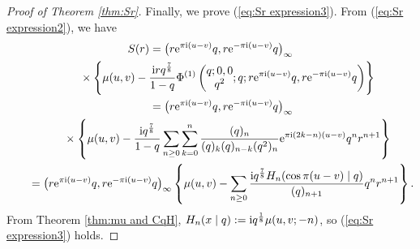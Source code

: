 \documentclass[pdftex]{sigma}
\numberwithin{equation}{section}
\theoremstyle{definition}
\begin{document}
\begin{proof}[Proof of Theorem \ref{thm:Sr}]
Finally, we prove (\ref{eq:Sr expression3}).
From (\ref{eq:Sr expression2}), we have
\begin{gather*}
S(r) =
 \big(r{\rm e}^{\pi{\rm i}(u-v)}q,r{\rm e}^{-\pi{\rm i}(u-v)}q\big)_{\infty }\\
\hphantom{S(r) =}{}\times \left\{
 \mu(u,v)-\frac{{\rm i}rq^{\frac{7}{8}}}{1-q}\Phi ^{(1)}\left(\begin{matrix}q;0,0 \\ q^2 \end{matrix};q;r{\rm e}^{\pi{\rm i}(u-v)}q,r{\rm e}^{-\pi{\rm i}(u-v)}q\right)\right\} \\
\hphantom{S(r)}{}
=
 \big(r{\rm e}^{\pi{\rm i}(u-v)}q, r{\rm e}^{-\pi{\rm i}(u-v)}q\big)_{\infty } \\
\hphantom{S(r) =}{}\times
 \left\{
 \mu(u,v)
 -\frac{{\rm i}q^{\frac{7}{8}}}{1-q}\sum_{n\geq 0}\sum_{k=0}^{n}
 \frac{(q)_{n}}{(q)_{k}(q)_{n-k}(q^{2})_{n}}{\rm e}^{\pi{\rm i}(2k-n)(u-v)}q^{n}r^{n+1}\right\} \\
\hphantom{S(r)}{} =
 \big(r{\rm e}^{\pi{\rm i}(u-v)}q, r{\rm e}^{-\pi{\rm i}(u-v)}q\big)_{\infty }
\left\{
 \mu(u,v)
 -\sum_{n\geq 0}\frac{{\rm i}q^{\frac{7}{8}}H_{n}(\cos{\pi (u-v)}\mid q)}{(q)_{n+1}}q^{n}r^{n+1}\right\}.
\end{gather*}
From Theorem \ref{thm:mu and CqH}, $H_{n}(x\mid q):={\rm i}q^\frac{1}{8}\mu(u,v;-n)$, so (\ref{eq:Sr expression3}) holds.
\end{proof}
\end{document}
